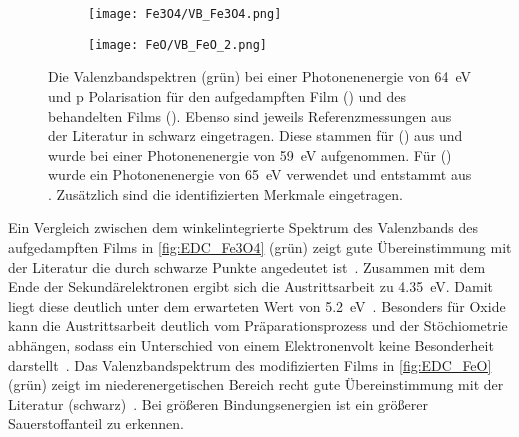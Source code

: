         \begin{figure}
            \begin{subfigure}[t]{0.48\textwidth}
                \centering
                \texttt{[image: Fe3O4/VB\_Fe3O4.png]}
                \subcaption{}
                \label{fig:EDC_Fe3O4}
            \end{subfigure}
            \begin{subfigure}[t]{0.48\textwidth}
                \centering
                \texttt{[image: FeO/VB\_FeO\_2.png]}
                \subcaption{}
                \label{fig:EDC_FeO}
            \end{subfigure}
            \caption{Die Valenzbandspektren (grün) bei einer Photonenenergie von \SI{64}{\electronvolt} und p Polarisation für den aufgedampften Film () und des behandelten Films ().
            Ebenso sind jeweils Referenzmessungen aus der Literatur in schwarz eingetragen.
            Diese stammen für () aus \cite{FeO_35} und wurde bei einer Photonenenergie von \SI{59}{\electronvolt} aufgenommen.
            Für () wurde ein Photonenenergie von \SI{65}{\electronvolt} verwendet und entstammt aus \cite{FeO_14}.
            Zusätzlich sind die identifizierten Merkmale eingetragen.}
            \label{fig:EDCs}
        \end{figure}
        Ein Vergleich zwischen dem winkelintegrierte Spektrum des Valenzbands des aufgedampften Films in \autoref{fig:EDC_Fe3O4} (grün) zeigt gute Übereinstimmung mit der Literatur die durch schwarze Punkte angedeutet ist~\cite{FeO_35}.
        Zusammen mit dem Ende der Sekundärelektronen ergibt sich die Austrittsarbeit zu \SI{4.35}{\electronvolt}.
        Damit liegt diese deutlich unter dem erwarteten Wert von \SI{5.2}{\electronvolt}~\cite{FeO_40}.
        Besonders für Oxide kann die Austrittsarbeit deutlich vom Präparationsprozess und der Stöchiometrie abhängen, sodass ein Unterschied von einem Elektronenvolt keine Besonderheit darstellt~\cite{IF_11}.
        Das Valenzbandspektrum des modifizierten Films in \autoref{fig:EDC_FeO} (grün) zeigt im niederenergetischen Bereich recht gute Übereinstimmung mit der Literatur (schwarz)~\cite{FeO_14}.
        Bei größeren Bindungsenergien ist ein größerer Sauerstoffanteil zu erkennen.
